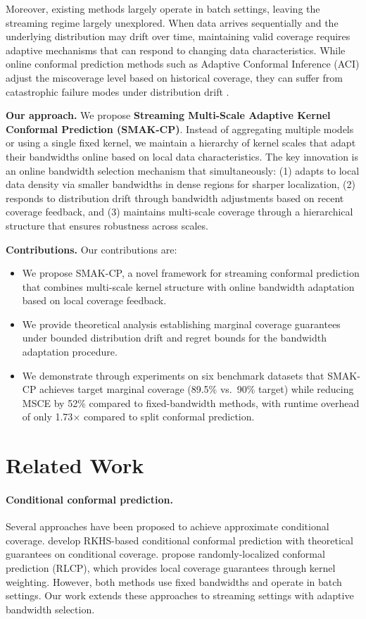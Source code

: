 \documentclass{article}
\theoremstyle{definition}
\begin{document}
Moreover, existing methods largely operate in batch settings, leaving the streaming regime largely unexplored. When data arrives sequentially and the underlying distribution may drift over time, maintaining valid coverage requires adaptive mechanisms that can respond to changing data characteristics. While online conformal prediction methods such as Adaptive Conformal Inference (ACI) \citep{gibbs2021adaptive} adjust the miscoverage level based on historical coverage, they can suffer from catastrophic failure modes under distribution drift \citep{bhatnagar2023improved}.

\textbf{Our approach.} We propose \textbf{Streaming Multi-Scale Adaptive Kernel Conformal Prediction (SMAK-CP)}. Instead of aggregating multiple models or using a single fixed kernel, we maintain a hierarchy of kernel scales that adapt their bandwidths online based on local data characteristics. The key innovation is an online bandwidth selection mechanism that simultaneously: (1) adapts to local data density via smaller bandwidths in dense regions for sharper localization, (2) responds to distribution drift through bandwidth adjustments based on recent coverage feedback, and (3) maintains multi-scale coverage through a hierarchical structure that ensures robustness across scales.

\textbf{Contributions.} Our contributions are:
\begin{itemize}
    \item We propose SMAK-CP, a novel framework for streaming conformal prediction that combines multi-scale kernel structure with online bandwidth adaptation based on local coverage feedback.
    \item We provide theoretical analysis establishing marginal coverage guarantees under bounded distribution drift and regret bounds for the bandwidth adaptation procedure.
    \item We demonstrate through experiments on six benchmark datasets that SMAK-CP achieves target marginal coverage (89.5\% vs.~90\% target) while reducing MSCE by 52\% compared to fixed-bandwidth methods, with runtime overhead of only 1.73$\times$ compared to split conformal prediction.
\end{itemize}

\section{Related Work}

\paragraph{Conditional conformal prediction.} Several approaches have been proposed to achieve approximate conditional coverage. \citet{gibbs2023conformal} develop RKHS-based conditional conformal prediction with theoretical guarantees on conditional coverage. \citet{hore2024conformal} propose randomly-localized conformal prediction (RLCP), which provides local coverage guarantees through kernel weighting. However, both methods use fixed bandwidths and operate in batch settings. Our work extends these approaches to streaming settings with adaptive bandwidth selection.
\end{document}
